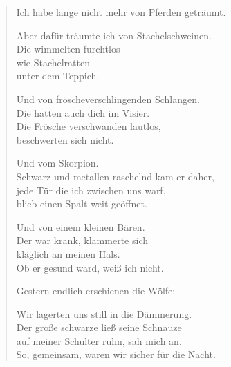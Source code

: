 

\begin{verse}
Ich habe lange nicht mehr von Pferden geträumt.

Aber dafür träumte ich von Stachelschweinen.\\
Die wimmelten furchtlos\\
wie Stachelratten\\
unter dem Teppich.

Und von fröscheverschlingenden Schlangen.\\
Die hatten auch dich im Visier.\\
Die Frösche verschwanden lautlos,\\
beschwerten sich nicht.

Und vom Skorpion.\\
Schwarz und metallen raschelnd kam er daher,\\
jede Tür die ich zwischen uns warf,\\
blieb einen Spalt weit geöffnet.

Und von einem kleinen Bären.\\
Der war krank, klammerte sich\\
kläglich an meinen Hals.\\
Ob er gesund ward, weiß ich nicht.

Gestern endlich erschienen die Wölfe:

Wir lagerten uns still in die Dämmerung.\\
Der große schwarze ließ seine Schnauze\\
auf meiner Schulter ruhn, sah mich an.\\
So, gemeinsam, waren wir sicher für die Nacht.
\end{verse}
